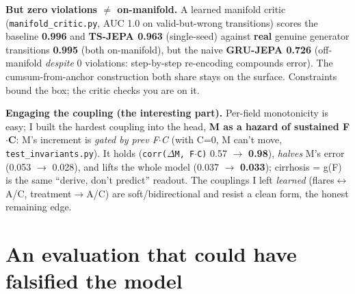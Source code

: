\textbf{But zero violations $\neq$ on-manifold.} A learned manifold critic (\texttt{manifold\_critic.py},
AUC 1.0 on valid-but-wrong transitions) scores the baseline \textbf{0.996} and \textbf{TS-JEPA 0.963}
(single-seed) against \textbf{real} genuine generator transitions \textbf{0.995} (both on-manifold),
but the naive \textbf{GRU-JEPA 0.726} (off-manifold \textit{despite} 0 violations: step-by-step
re-encoding compounds error). The cumsum-from-anchor construction both share stays on the surface.
Constraints bound the box; the critic checks you are on it.

\textbf{Engaging the coupling (the interesting part).} Per-field monotonicity is easy; I built the hardest
coupling into the head, \textbf{M as a hazard of sustained F$\cdot$C}: M's increment is \textit{gated by
prev F$\cdot$C} (with C=0, M can't move, \texttt{test\_invariants.py}). It holds (\texttt{corr($\Delta$M,
F$\cdot$C)} 0.57 $\to$ \textbf{0.98}), \textit{halves} M's error (0.053 $\to$ 0.028), and lifts the whole
model (0.037 $\to$ \textbf{0.033}); cirrhosis = g(F) is the same ``derive, don't predict'' readout. The
couplings I left \textit{learned} (flares$\leftrightarrow$A/C, treatment$\to$A/C) are soft/bidirectional
and resist a clean form, the honest remaining edge.

\section{An evaluation that could have falsified the model}

